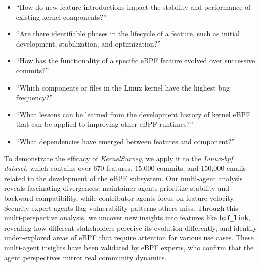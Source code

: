 \documentclass[sigconf,review,anonymous]{acmart}
\newcommand{\sys}{\textit{KernelSurvey}\xspace}
\begin{document}
\begin{itemize}
    \item ``How do new feature introductions impact the stability and performance of existing kernel components?''
    \item ``Are there identifiable phases in the lifecycle of a feature, such as initial development, stabilization, and optimization?''
    \item ``How has the functionality of a specific eBPF feature evolved over successive commits?''
    \item ``Which components or files in the Linux kernel have the highest bug frequency?''
    \item ``What lessons can be learned from the development history of kernel eBPF that can be applied to improving other eBPF runtimes?''
    \item ``What dependencies have emerged between features and component?''
\end{itemize}

To demonstrate the efficacy of \sys, we apply it to the \textit{Linux-bpf dataset}, which contains over 670 features, 15,000 commits, and 150,000 emails related to the development of the eBPF subsystem. Our multi-agent analysis reveals fascinating divergences: maintainer agents prioritize stability and backward compatibility, while contributor agents focus on feature velocity. Security expert agents flag vulnerability patterns others miss. Through this multi-perspective analysis, we uncover new insights into features like \texttt{bpf\_link}, revealing how different stakeholders perceive its evolution differently, and identify under-explored areas of eBPF that require attention for various use cases. These multi-agent insights have been validated by eBPF experts, who confirm that the agent perspectives mirror real community dynamics.
\end{document}
